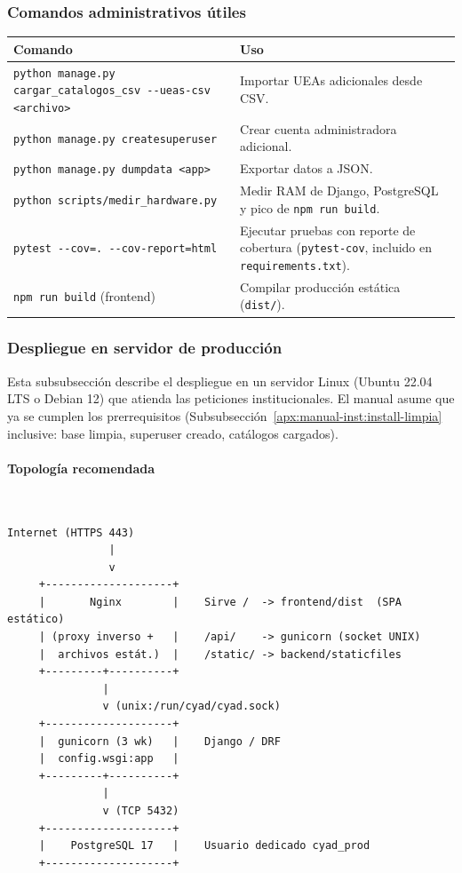\subsubsection{Comandos administrativos útiles}

\begin{longtable}{p{} p{}}
    \toprule
    \textbf{Comando} & \textbf{Uso} \\
    \midrule
    \endhead
    \texttt{python manage.py cargar\_catalogos\_csv \allowbreak -{}-ueas-csv <archivo>} & Importar UEAs adicionales desde CSV. \\
    \midrule
    \texttt{python manage.py createsuperuser} & Crear cuenta administradora adicional. \\
    \midrule
    \texttt{python manage.py dumpdata <app>} & Exportar datos a JSON. \\
    \midrule
    \texttt{python scripts/medir\_hardware.py} & Medir RAM de Django, PostgreSQL y pico de \texttt{npm run build}. \\
    \midrule
    \texttt{pytest -{}-cov=. \allowbreak -{}-cov-report=html} & Ejecutar pruebas con reporte de cobertura (\texttt{pytest-cov}, incluido en \texttt{requirements.txt}). \\
    \midrule
    \texttt{npm run build} (frontend) & Compilar producción estática (\texttt{dist/}). \\
    \bottomrule
\end{longtable}

\subsubsection{Despliegue en servidor de producción}
\label{apx:manual-inst:despliegue-produccion}

Esta subsubsección describe el despliegue en un servidor Linux (Ubuntu 22.04 LTS o Debian 12) que atienda las peticiones institucionales. El manual asume que ya se cumplen los prerrequisitos (Subsubsección~\ref{apx:manual-inst:install-limpia} inclusive: base limpia, superuser creado, catálogos cargados).

\paragraph{Topología recomendada}\mbox{}\\
\begin{lstlisting}[style=mystyle-sn]
        Internet (HTTPS 443)
                |
                v
     +--------------------+
     |       Nginx        |    Sirve /  -> frontend/dist  (SPA estático)
     | (proxy inverso +   |    /api/    -> gunicorn (socket UNIX)
     |  archivos estát.)  |    /static/ -> backend/staticfiles
     +---------+----------+
               |
               v (unix:/run/cyad/cyad.sock)
     +--------------------+
     |  gunicorn (3 wk)   |    Django / DRF
     |  config.wsgi:app   |
     +---------+----------+
               |
               v (TCP 5432)
     +--------------------+
     |    PostgreSQL 17   |    Usuario dedicado cyad_prod
     +--------------------+
\end{lstlisting}

